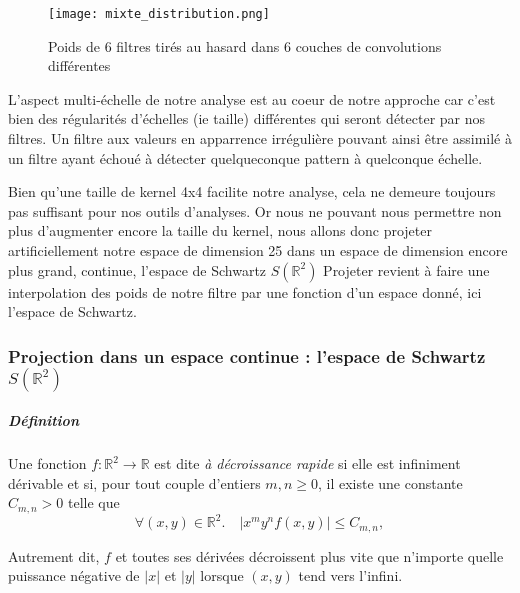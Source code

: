 \documentclass[12pt,a4paper]{article}
\begin{document}
\begin{figure}[H] %
    \centering    %
    \texttt{[image: mixte\_distribution.png]} %
    \caption{Poids de 6 filtres tirés au hasard dans 6 couches de convolutions différentes} %
    \label{fig:mon_image} %
\end{figure}
L'aspect multi-échelle de notre analyse est au coeur de notre approche car c'est bien des régularités d'échelles (ie taille) différentes qui seront détecter par nos filtres. Un filtre aux valeurs en apparrence irrégulière pouvant ainsi être assimilé à un filtre ayant échoué à détecter quelqueconque pattern à quelconque échelle.

Bien qu'une taille de kernel 4x4 facilite notre analyse, cela ne demeure toujours pas suffisant pour nos outils d'analyses. Or nous ne pouvant nous permettre non plus d'augmenter encore la taille du kernel, nous allons donc projeter artificiellement notre espace de dimension 25 dans un espace de dimension encore plus grand, continue, l'espace de Schwartz $S(\mathbb{R}^2)$
Projeter revient à faire une interpolation des poids de notre filtre par une fonction d'un espace donné, ici l'espace de Schwartz.
\subsubsection{Projection dans un espace continue : l'espace de Schwartz $S(\mathbb{R}^2)$}
\subparagraph{Définition}
Une fonction $f : \mathbb{R}^2 \to \mathbb{R}$ est dite \emph{à décroissance rapide} si elle est infiniment dérivable et si, pour tout couple d'entiers $m,n \ge 0$, il existe une constante $C_{m,n} > 0$ telle que
\[
\forall (x,y) \in \mathbb{R}^2.\quad
|x^m y^n f(x,y)| \le C_{m,n},
\]

Autrement dit, $f$ et toutes ses dérivées décroissent plus vite que n'importe quelle puissance négative de $|x|$ et $|y|$ lorsque $(x,y)$ tend vers l'infini.  
\end{document}
